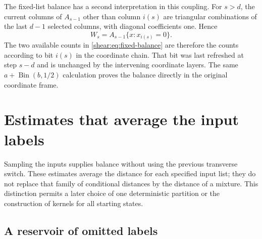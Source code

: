 The fixed-list balance has a second interpretation in this
coupling. For $s>d$, the current columns of $A_{s-1}$ other
than column $i(s)$ are triangular combinations of the last
$d-1$ selected columns, with diagonal coefficients one. Hence
\[
 W_s=A_{s-1}\{x:x_{i(s)}=0\}.
\]
The two available counts in \eqref{shear:eq:fixed-balance} are
therefore the counts according to bit $i(s)$ in the coordinate
chain. That bit was last refreshed at step $s-d$ and is
unchanged by the intervening coordinate layers. The same
$a+\operatorname{Bin}(b,1/2)$ calculation proves the balance
directly in the original coordinate frame.

\section{Estimates that average the input labels}
\label{shear:sec:averaged}

Sampling the inputs supplies balance without using the previous
transverse switch. These estimates average the distance for each
specified input list; they do not replace that family of
conditional distances by the distance of a mixture. This
distinction permits a later choice of one deterministic partition
or the construction of kernels for all starting states.

\subsection{A reservoir of omitted labels}

